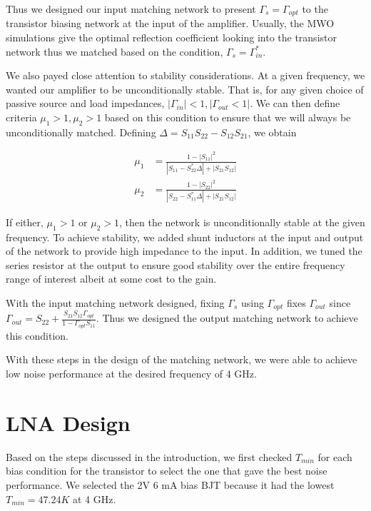 \documentclass[twocolumn, aps, floatfix]{revtex4-1}
\begin{document}
Thus we designed our input matching network to present $\Gamma_s = \Gamma_{opt}$ to the transistor biasing network at the input of the amplifier. Usually, the MWO simulations give the optimal reflection coefficient looking into the transistor network thus we matched based on the condition, $\Gamma_s = \Gamma_{in}^*$. 

We also payed close attention to stability considerations. At a given frequency, we wanted our amplifier to be unconditionally stable. That is, for any given choice of passive source and load impedances, $|\Gamma_{in}| < 1, |\Gamma_{out} < 1|$. We can then define criteria $\mu_1 > 1, \mu_2 > 1$ based on this condition to ensure that we will always be unconditionally matched. Defining $\Delta = S_{11}S_{22} - S_{12}S_{21}$, we obtain

\begin{align}
    \mu_1 &= \frac{1 - |S_{11}|^2}{|S_{11} - S_{22}^* \Delta| + |S_{21}S_{12}|} \\
    \mu_2 &= \frac{1 - |S_{22}|^2}{|S_{22} - S_{11}^* \Delta| + |S_{21}S_{12}|}
\end{align}

If either, $\mu_1 > 1$ or $\mu_2 > 1$, then the network is unconditionally stable at the given frequency. To achieve stability, we added shunt inductors at the input and output of the network to provide high impedance to the input. In addition, we tuned the series resistor at the output to ensure good stability over the entire frequency range of interest albeit at some cost to the gain.

With the input matching network designed, fixing $\Gamma_s $ using $ \Gamma_{opt}$ fixes $\Gamma_{out}$ since $\Gamma_{out} = S_{22} + \frac{S_{21}S_{12}\Gamma_{opt}}{1 - \Gamma_{opt} S_{11}}$. Thus we designed the output matching network to achieve this condition. 

With these steps in the design of the matching network, we were able to achieve low noise performance at the desired frequency of 4 GHz.

\section*{LNA Design}\label{sec:design}
Based on the steps discussed in the introduction, we first checked $T_{min}$ for each bias condition for the transistor to select the one that gave the best noise performance. We selected the 2V 6 mA bias BJT because it had the lowest $T_{min} = 47.24 K$ at 4 GHz.
\end{document}
